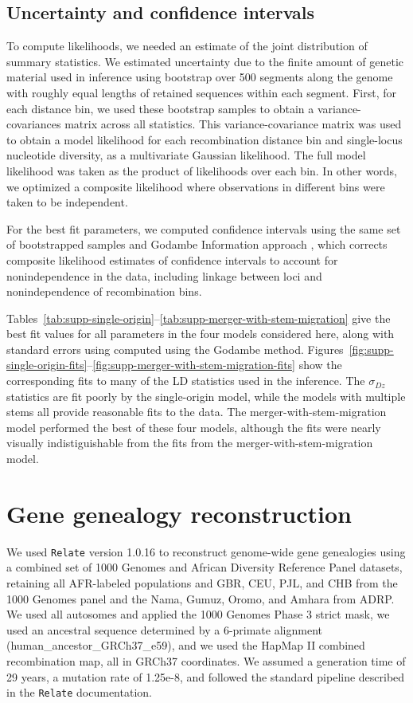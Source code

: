 \documentclass[]{article}
\newcommand{\Relate}{\texttt{Relate}\xspace}
\begin{document}
\subsection{Uncertainty and confidence intervals}

To compute likelihoods, we needed an estimate of the joint
distribution of summary statistics. 
We estimated uncertainty due to the finite amount of genetic material
used in inference using bootstrap over 500 segments along the genome with
roughly equal lengths of retained sequences within each segment. First, for
each distance bin, we used these bootstrap samples to obtain a
variance-covariances matrix across all statistics. This variance-covariance
matrix was used to obtain a model likelihood for each recombination distance
bin and single-locus nucleotide diversity, as a multivariate Gaussian
likelihood. The full model likelihood was taken as the product of likelihoods
over each bin. In other words, we optimized a composite likelihood where
observations in different bins were taken to be independent. 

For the best fit parameters, we computed confidence intervals using the 
same set of bootstrapped samples and Godambe Information
approach \citep{Coffman2016-yq}, which corrects composite likelihood estimates of confidence intervals
to account for nonindependence in the data, including linkage between loci and
nonindependence of recombination bins.

Tables~\ref{tab:supp-single-origin}--\ref{tab:supp-merger-with-stem-migration}
give the best fit values for all parameters in the four models considered here,
along with standard errors using computed using the Godambe method.
Figures~\ref{fig:supp-single-origin-fits}--\ref{fig:supp-merger-with-stem-migration-fits}
show the corresponding fits to many of the LD statistics used in the inference.
The $\sigma_{Dz}$ statistics are fit poorly by the single-origin model, while
the models with multiple stems all provide reasonable fits to the data. The
merger-with-stem-migration model performed the best of these four models,
although the fits were nearly visually indistiguishable from the fits from the
merger-with-stem-migration model.

\section{Gene genealogy reconstruction}
\label{sec:relate}

We used \Relate version 1.0.16 \citep{Speidel2019-nj} to reconstruct genome-wide
gene genealogies using a combined set of 1000 Genomes and African Diversity
Reference Panel datasets, retaining all AFR-labeled populations and GBR, CEU,
PJL, and CHB from the 1000 Genomes panel and the Nama, Gumuz, Oromo, and Amhara
from ADRP. We used all autosomes and applied the 1000 Genomes Phase 3 strict
mask, we used an ancestral sequence determined by a 6-primate alignment
(human\_ancestor\_GRCh37\_e59), and we used the HapMap II combined
recombination map, all in GRCh37 coordinates. We assumed a generation time of
29 years, a mutation rate of 1.25e-8, and followed the standard pipeline
described in the \Relate documentation.
\end{document}
